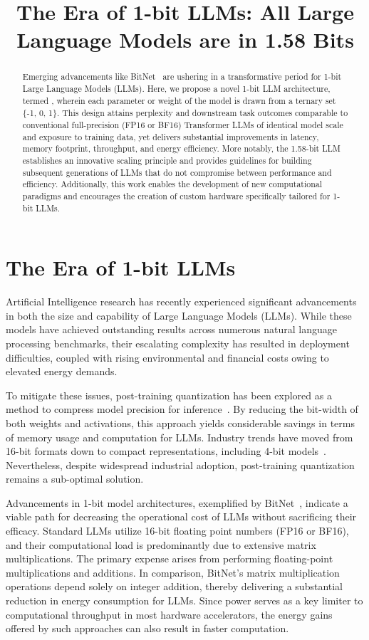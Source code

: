 \title{The Era of 1-bit LLMs: All Large Language Models are in 1.58 Bits}

\begin{abstract}
Emerging advancements like BitNet~\cite{bitnet} are ushering in a transformative period for 1-bit Large Language Models (LLMs). Here, we propose a novel 1-bit LLM architecture, termed \textbf{}, wherein each parameter or weight of the model is drawn from a ternary set \{-1, 0, 1\}. This design attains perplexity and downstream task outcomes comparable to conventional full-precision (FP16 or BF16) Transformer LLMs of identical model scale and exposure to training data, yet delivers substantial improvements in latency, memory footprint, throughput, and energy efficiency. More notably, the 1.58-bit LLM establishes an innovative scaling principle and provides guidelines for building subsequent generations of LLMs that do not compromise between performance and efficiency. Additionally, this work enables the development of new computational paradigms and encourages the creation of custom hardware specifically tailored for 1-bit LLMs.
\end{abstract}

\section{The Era of 1-bit LLMs}

Artificial Intelligence research has recently experienced significant advancements in both the size and capability of Large Language Models (LLMs). While these models have achieved outstanding results across numerous natural language processing benchmarks, their escalating complexity has resulted in deployment difficulties, coupled with rising environmental and financial costs owing to elevated energy demands.

To mitigate these issues, post-training quantization has been explored as a method to compress model precision for inference~\cite{smoothquant, gptq, quip, quip_sharp}. By reducing the bit-width of both weights and activations, this approach yields considerable savings in terms of memory usage and computation for LLMs. Industry trends have moved from 16-bit formats down to compact representations, including 4-bit models~\cite{gptq, awq}. Nevertheless, despite widespread industrial adoption, post-training quantization remains a sub-optimal solution.

Advancements in 1-bit model architectures, exemplified by BitNet~\cite{bitnet}, indicate a viable path for decreasing the operational cost of LLMs without sacrificing their efficacy. Standard LLMs utilize 16-bit floating point numbers (FP16 or BF16), and their computational load is predominantly due to extensive matrix multiplications. The primary expense arises from performing floating-point multiplications and additions. In comparison, BitNet’s matrix multiplication operations depend solely on integer addition, thereby delivering a substantial reduction in energy consumption for LLMs. Since power serves as a key limiter to computational throughput in most hardware accelerators, the energy gains offered by such approaches can also result in faster computation.

